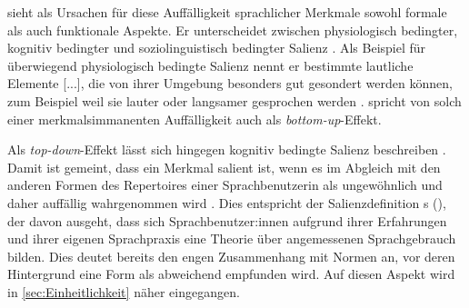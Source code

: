 \citet{Auer2014} sieht als Ursachen für diese Auffälligkeit sprachlicher Merkmale sowohl formale als auch funktionale Aspekte.
Er unterscheidet zwischen physiologisch bedingter, kognitiv bedingter und soziolinguistisch bedingter Salienz \citep[s.][9--10]{Auer2014}. 
Als Beispiel für überwiegend physiologisch bedingte Salienz nennt er \glqq bestimmte lautliche Elemente [...], die von ihrer Umgebung besonders gut gesondert werden können, zum Beispiel weil sie lauter oder langsamer gesprochen werden\grqq{} \citep[9]{Auer2014}. 
\citet[38]{Purschke2014} spricht von solch einer merkmalsimmanenten Auffälligkeit auch als \textit{bottom-up}-Effekt. 

Als \textit{top-down}-Effekt lässt sich hingegen kognitiv bedingte Salienz beschreiben \citep[s.][38]{Purschke2014}. 
Damit ist gemeint, dass ein Merkmal salient ist, wenn es im Abgleich mit den anderen Formen des Repertoires einer Sprachbenutzerin als ungewöhnlich und daher auffällig wahrgenommen wird \citep[9--10]{Auer2014}. 
Dies entspricht der Salienzdefinition \citeauthor{Gessinger.2008}s (\citeyear[134]{Gessinger.2008}), der davon ausgeht, dass sich Sprachbenutzer:innen aufgrund ihrer Erfahrungen und ihrer eigenen Sprachpraxis eine Theorie über angemessenen Sprachgebrauch bilden. 
Dies deutet bereits den engen Zusammenhang mit Normen an, vor deren Hintergrund eine Form als abweichend empfunden wird. 
Auf diesen Aspekt wird in \autoref{sec:Einheitlichkeit} näher eingegangen.

